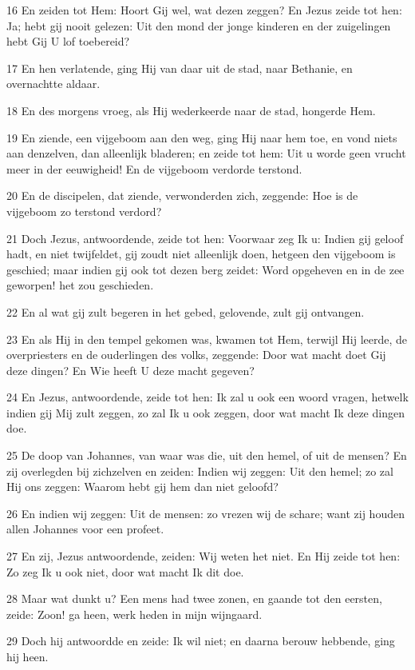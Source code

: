 \par 16 En zeiden tot Hem: Hoort Gij wel, wat dezen zeggen? En Jezus zeide tot hen: Ja; hebt gij nooit gelezen: Uit den mond der jonge kinderen en der zuigelingen hebt Gij U lof toebereid?
\par 17 En hen verlatende, ging Hij van daar uit de stad, naar Bethanie, en overnachtte aldaar.
\par 18 En des morgens vroeg, als Hij wederkeerde naar de stad, hongerde Hem.
\par 19 En ziende, een vijgeboom aan den weg, ging Hij naar hem toe, en vond niets aan denzelven, dan alleenlijk bladeren; en zeide tot hem: Uit u worde geen vrucht meer in der eeuwigheid! En de vijgeboom verdorde terstond.
\par 20 En de discipelen, dat ziende, verwonderden zich, zeggende: Hoe is de vijgeboom zo terstond verdord?
\par 21 Doch Jezus, antwoordende, zeide tot hen: Voorwaar zeg Ik u: Indien gij geloof hadt, en niet twijfeldet, gij zoudt niet alleenlijk doen, hetgeen den vijgeboom is geschied; maar indien gij ook tot dezen berg zeidet: Word opgeheven en in de zee geworpen! het zou geschieden.
\par 22 En al wat gij zult begeren in het gebed, gelovende, zult gij ontvangen.
\par 23 En als Hij in den tempel gekomen was, kwamen tot Hem, terwijl Hij leerde, de overpriesters en de ouderlingen des volks, zeggende: Door wat macht doet Gij deze dingen? En Wie heeft U deze macht gegeven?
\par 24 En Jezus, antwoordende, zeide tot hen: Ik zal u ook een woord vragen, hetwelk indien gij Mij zult zeggen, zo zal Ik u ook zeggen, door wat macht Ik deze dingen doe.
\par 25 De doop van Johannes, van waar was die, uit den hemel, of uit de mensen? En zij overlegden bij zichzelven en zeiden: Indien wij zeggen: Uit den hemel; zo zal Hij ons zeggen: Waarom hebt gij hem dan niet geloofd?
\par 26 En indien wij zeggen: Uit de mensen: zo vrezen wij de schare; want zij houden allen Johannes voor een profeet.
\par 27 En zij, Jezus antwoordende, zeiden: Wij weten het niet. En Hij zeide tot hen: Zo zeg Ik u ook niet, door wat macht Ik dit doe.
\par 28 Maar wat dunkt u? Een mens had twee zonen, en gaande tot den eersten, zeide: Zoon! ga heen, werk heden in mijn wijngaard.
\par 29 Doch hij antwoordde en zeide: Ik wil niet; en daarna berouw hebbende, ging hij heen.
